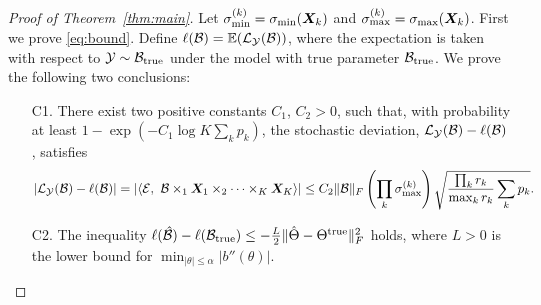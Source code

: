 \documentclass[12pt]{article}
\theoremstyle{definition}
\theoremstyle{definition}
\begin{document}
\begin{proof}[Proof of Theorem~\ref{thm:main}]
Let $\sigma_{\text{min}}^{(k)} = \sigma_{\text{min}}(\bm X_k)$ and  $\sigma_{\text{max}}^{(k)} = \sigma_{\text{max}}(\bm X_k)$. First we prove \eqref{eq:bound}. 
Define $\ell(\mathcal{B})=\mathbb{E}(\mathcal{L}_{\mathcal{Y}}(\mathcal{B}))$, where the expectation is taken with respect to $\mathcal{Y}\sim \mathcal{B}_{\textup{true}}$ under the model with true parameter $\mathcal{B}_{\textup{true}}$. We prove the following two conclusions:
\begin{enumerate}
\item[C1.] There exist two positive constants $C_1$, $C_2>0$, such that, with probability at least $1-\exp(-C_1\log K\sum_k p_k)$, the stochastic deviation, $\mathcal{L}_{\mathcal{Y}}(\mathcal{B})-\ell(\mathcal{B})$, satisfies
\[
|\tL_{\tY}(\tB)-\ell(\tB)|=|\langle \tE,\ \tB\times_1\mX_1\times_2\cdots\times_K \mX_K\rangle| \leq C_2\FnormSize{}{\tB} \left(\prod_k \sigma_{\text{max}}^{(k)}\right)\sqrt{{\prod_k r_k \over \max_k r_k} \sum_k p_k}.
\]
\item[C2.] The inequality $\ell(\hat {\mathcal{B}}) - \ell(\mathcal{B}_{\textup{true}}) \leq  -{L\over 2}\lVert\hat \Theta-\Theta^{\text{true}}\rVert_F^2$ holds, where $L>0$ is the lower bound for $\min_{|\theta|\leq \alpha}|b''(\theta)|$. 
\end{enumerate}


\end{proof}
\end{document}
